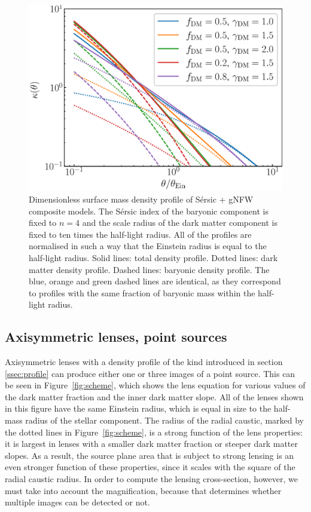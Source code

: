 \documentclass{aa}
\def\Fref#1{Figure~\ref{#1}\xspace}
\begin{document}
%
\begin{figure}
\includegraphics[width=\columnwidth]{composite_fixedap_kappa.eps}
\caption{
Dimensionless surface mass density profile of S\'{e}rsic + gNFW composite models.
The S\'{e}rsic index of the baryonic component is fixed to $n=4$ and the scale radius of the dark matter component is fixed to ten times the half-light radius.
All of the profiles are normalised in such a way that the Einstein radius is equal to the half-light radius.
Solid lines: total density profile. Dotted lines: dark matter density profile. Dashed lines: baryonic density profile.
The blue, orange and green dashed lines are identical, as they correspond to profiles with the same fraction of baryonic mass within the half-light radius.
\label{fig:kappa}
}
\end{figure}
%

\subsection{Axisymmetric lenses, point sources}\label{ssec:axisymmpoint}

Axisymmetric lenses with a density profile of the kind introduced in section \ref{ssec:profile} can produce either one or three images of a point source.
This can be seen in \Fref{fig:scheme}, which shows the lens equation for various values of the dark matter fraction and the inner dark matter slope.
All of the lenses shown in this figure have the same Einstein radius, which is equal in size to the half-mass radius of the stellar component.
The radius of the radial caustic, marked by the dotted lines in \Fref{fig:scheme}, is a strong function of the lens properties: it is largest in lenses with a smaller dark matter fraction or steeper dark matter slopes.
As a result, the source plane area that is subject to strong lensing is an even stronger function of these properties, since it scales with the square of the radial caustic radius.
In order to compute the lensing cross-section, however, we must take into account the magnification, because that determines whether multiple images can be detected or not.
\end{document}
